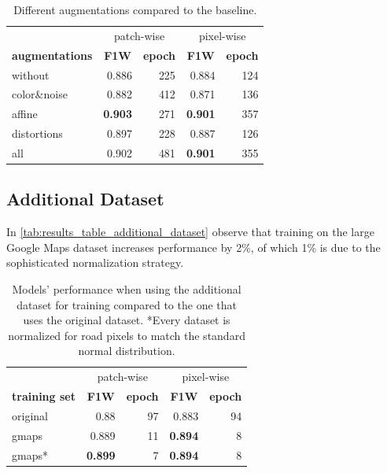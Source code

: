 \documentclass[10pt,conference,compsocconf]{IEEEtran}
\begin{document}
\begin{table}[ht!]
    \centering
    \begin{tabular}{l|rr|rr}
        \toprule
        \multicolumn{1}{c}{} &
        \multicolumn{2}{c}{patch-wise} &
        \multicolumn{2}{c}{pixel-wise} \\
        \multicolumn{1}{c}{\textbf{augmentations}} &
        \multicolumn{1}{c}{\textbf{F1W}} &
        \multicolumn{1}{c}{\textbf{epoch}} &
        \multicolumn{1}{c}{\textbf{F1W}} &
        \multicolumn{1}{c}{\textbf{epoch}} \\
        \midrule
            without & 0.886 & 225 & 0.884 & 124 \\
            color\&noise & 0.882 & 412 & 0.871 & 136 \\
            affine & \textbf{0.903} & 271 & \textbf{0.901} & 357 \\
            distortions & 0.897 & 228 & 0.887 & 126 \\
            all & 0.902 & 481 & \textbf{0.901} & 355 \\
        \bottomrule
    \end{tabular}
    \caption{Different augmentations compared to the baseline.}
    \label{tab:results_table_augmentations}
\end{table}

\subsection{Additional Dataset}
In \autoref{tab:results_table_additional_dataset} observe that training on the large Google Maps dataset increases performance by 2\%, of which 1\% is due to the sophisticated normalization strategy.

\begin{table}[ht!]
    \centering
    \begin{tabular}{l|rr|rr}
        \toprule
        \multicolumn{1}{c}{} &
        \multicolumn{2}{c}{patch-wise} &
        \multicolumn{2}{c}{pixel-wise} \\
        \multicolumn{1}{c}{\textbf{training set}} &
        \multicolumn{1}{c}{\textbf{F1W}} &
        \multicolumn{1}{c}{\textbf{epoch}} &
        \multicolumn{1}{c}{\textbf{F1W}} &
        \multicolumn{1}{c}{\textbf{epoch}} \\
        \midrule
            original & 0.88 & 97 & 0.883 & 94 \\
            gmaps & 0.889 & 11 & \textbf{0.894} & 8 \\
            gmaps* & \textbf{0.899} & 7 & \textbf{0.894} & 8 \\
        \bottomrule
    \end{tabular}
    \caption{Models' performance when using the additional dataset for training compared to the one that uses the original dataset.
    *Every dataset is normalized for road pixels to match the standard normal distribution.}
    \label{tab:results_table_additional_dataset}
\end{table}
\end{document}

